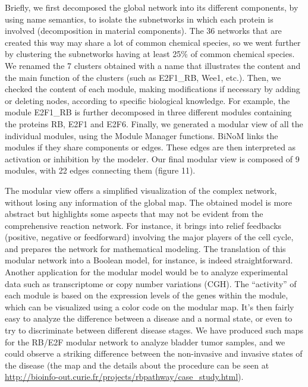 \documentclass[10pt]{bmc_article}
\newenvironment{bmcformat}{\baselineskip20pt\sloppy\setboolean{publ}{false}}{\baselineskip20pt\sloppy}
\begin{document}
\begin{bmcformat}
Briefly, we first decomposed the global network into its different components,
by using name semantics, to isolate the subnetworks in which
each protein is involved (decomposition in material components). The 36 networks that are created this way may share a
lot of common chemical species, so we went further
by clustering the subnetworks having at least 25\% of common chemical species. We renamed
the 7 clusters obtained with a name that illustrates the content and the main
function of the clusters (such as E2F1\_RB, Wee1, etc.). Then, we checked the
content of each module, making modifications if necessary by adding or deleting nodes, according to specific biological knowledge.
For example, the module E2F1\_RB is
further decomposed in three different modules containing the proteins RB, E2F1
and E2F6. Finally, we generated a modular view of all the individual modules, using the Module Manager functions.
BiNoM links the modules if they share components or edges. These edges are then
interpreted as activation or inhibition by the modeler. Our final
modular view is composed of 9 modules, with 22
edges connecting them (figure 11). 




The modular view offers a simplified visualization of the complex network,
without losing any information of the global map. The
obtained model is more abstract but highlights some aspects that may not be
evident from the comprehensive reaction network. For instance, it brings into
relief feedbacks (positive, negative or feedforward) involving the major players of the
cell cycle, and prepares the network for mathematical modeling. The translation
of this modular network into a Boolean model, for instance, is indeed straightforward. Another
application for the modular model would be to analyze experimental data such as
transcriptome or copy number variations (CGH). The ``activity'' of each module
is based on the expression levels of the genes within the module,
which can be visualized using a color code on the modular map. It's then fairly easy to analyze
the difference between a disease and a normal state, or even to try to
discriminate between different disease stages. We have produced such maps for the
RB/E2F modular network to analyze bladder tumor samples, and we could observe a
striking difference between the non-invasive and invasive states of the disease
\cite{calzone2008comprehensive}(the map and the details about the procedure can be seen at
\url{http://bioinfo-out.curie.fr/projects/rbpathway/case_study.html}).


\end{bmcformat}
\end{document}
